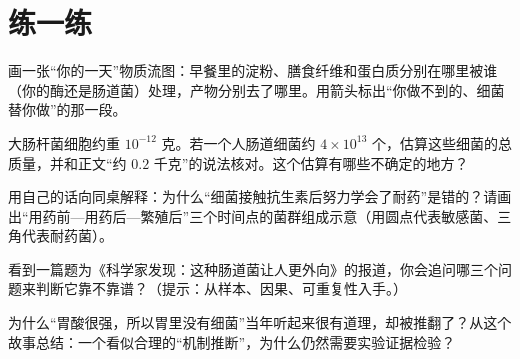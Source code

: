 \section*{练一练}

\begin{sikaoti}
\item 画一张“你的一天”物质流图：早餐里的淀粉、膳食纤维和蛋白质分别在哪里被谁（你的酶还是肠道菌）处理，产物分别去了哪里。用箭头标出“你做不到的、细菌替你做”的那一段。
\item 大肠杆菌细胞约重 $10^{-12}$ 克。若一个人肠道细菌约 $4\times 10^{13}$ 个，估算这些细菌的总质量，并和正文“约 $0.2$ 千克”的说法核对。这个估算有哪些不确定的地方？
\item 用自己的话向同桌解释：为什么“细菌接触抗生素后努力学会了耐药”是错的？请画出“用药前—用药后—繁殖后”三个时间点的菌群组成示意（用圆点代表敏感菌、三角代表耐药菌）。
\item 看到一篇题为《科学家发现：这种肠道菌让人更外向》的报道，你会追问哪三个问题来判断它靠不靠谱？（提示：从样本、因果、可重复性入手。）
\item 为什么“胃酸很强，所以胃里没有细菌”当年听起来很有道理，却被推翻了？从这个故事总结：一个看似合理的“机制推断”，为什么仍然需要实验证据检验？
\end{sikaoti}
